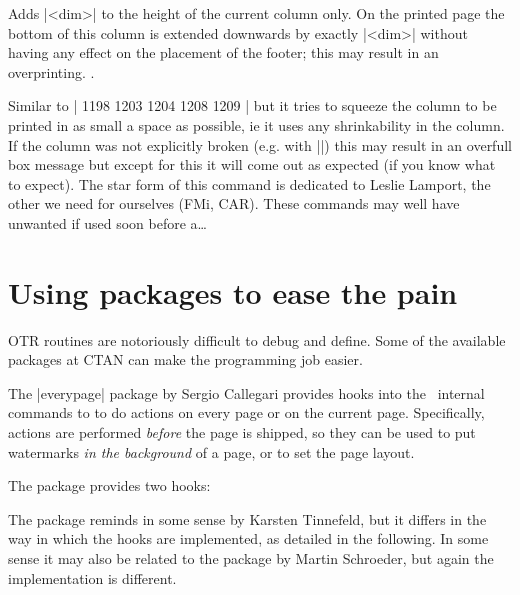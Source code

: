 \begin{teXX}
\gdef \enlargethispage{%
1198 \@ifstar
1199 {%
1203   \@enlargepage{\hbox{\kern\p@}}}%
1204 {%
1208   \@enlargepage\@empty}%
1209 }
\end{teXX}

Adds |<dim>| to the height of the current column only. On the printed page the
bottom of this column is extended downwards by exactly |<dim>| without having
any effect on the placement of the footer; this may result in an overprinting.
.

Similar to |\enlargethispage| but it tries to squeeze the column to be printed
in as small a space as possible, ie it uses any shrinkability in the column. If the
column was not explicitly broken (e.g. with |\pagebreak|) this may result in an
overfull box message but except for this it will come out as expected (if you know
what to expect).
The star form of this command is dedicated to Leslie Lamport, the other we
need for ourselves (FMi, CAR).
These commands may well have unwanted if used soon before a\ldots

 




\section{Using packages to ease the pain}

OTR routines are notoriously difficult to debug and define. Some of the available packages at CTAN
can make the programming job easier.

The |everypage| package by Sergio Callegari provides hooks into the \latex\ internal commands to
to do actions on every page or on the current page. Specifically, actions  are performed \emph{before} the page is shipped, so they can be
used to put watermarks \emph{in the background} of a page, or to
set the page layout. 

The package provides two hooks:

\begin{teXXX}
  \AddThisPageHook
\end{teXXX}

The package reminds in some sense
 by Karsten Tinnefeld, but it differs in the way in
 which the hooks are implemented, as detailed in the following.
 In some sense it may also be related to the package
  by Martin Schroeder, but again the implementation
 is different.

